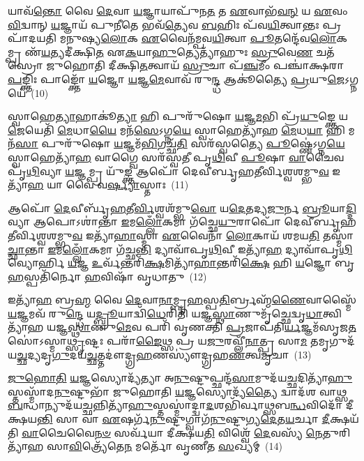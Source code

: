 𑌯𑌾𑌵᳴\-\ul{𑌨𑍍𑌤𑍋} 𑌵𑍈 \ul{𑌦𑍇}\-𑌵𑌾 \ul{𑌯}\-𑌜𑍍𑌞𑌾𑌯𑌾𑌪𑍁᳴𑌨\-\ul{𑌤} 𑌤 \ul{𑌏}\-𑌵𑌾𑌭᳴\-\ul{𑌵}\-\-\ul{𑌨𑍍} 𑌯 \ul{𑌏}\-𑌵𑌂 \ul{𑌵𑌿}\-𑌦𑍍𑌵𑌾𑌨𑍍 \ul{𑌯}\-𑌜𑍍𑌞𑌾𑌯᳴ 𑌪𑍁\-\ul{𑌨𑍀}\-𑌤𑍇 𑌭𑌵᳴\-\ul{𑌤𑍍𑌯𑍇}\-𑌵 \ul{𑌬}\-𑌹𑌿𑌃 𑌪᳴𑌵\-\ul{𑌯𑌿}\-𑌤𑍍𑌵𑌾𑌨𑍍𑌤𑌃 𑌪𑍍𑌰 𑌪𑌾᳴𑌦𑌯𑌤𑌿 𑌮𑌨𑍁𑌷𑍍𑌯\-\ul{𑌲𑍋}\-𑌕 \ul{𑌏}\-𑌵𑍈𑌨᳴𑌮𑍍𑌪𑌵\-\ul{𑌯𑌿}\-𑌤𑍍𑌵𑌾 \ul{𑌪𑍂}\-𑌤𑌨𑍍𑌦𑍇᳴𑌵\-\ul{𑌲𑍋}\-𑌕𑌮𑍍𑌪𑍍𑌰 𑌣᳴\-\ul{𑌯}\-𑌤𑍍𑌯𑌦𑍀॑𑌕𑍍𑌷𑌿\-\ul{𑌤} 𑌏\-\ul{𑌕}\-𑌯𑌾\-\ul{𑌹𑍁}\-𑌤𑍍𑌯𑍇𑌤𑍍𑌯𑌾᳴𑌹𑍁𑌃 \ul{𑌸𑍍𑌰𑍁}\-𑌵𑍇\-\ul{𑌣} 𑌚𑌤᳴𑌸𑍍𑌰𑍋 𑌜𑍁𑌹𑍋𑌤𑌿 𑌦𑍀𑌕𑍍𑌷𑌿\-\ul{𑌤}\-𑌤𑍍𑌵𑌾𑌯᳴ \ul{𑌸𑍍𑌰𑍁}\-𑌚𑌾 𑌪᳴\-\ul{𑌞𑍍𑌚}\-𑌮𑍀𑌂 𑌪𑌞𑍍𑌚𑌾॑𑌕𑍍𑌷𑌰𑌾 \ul{𑌪}\-𑌙𑍍𑌕𑍍𑌤𑌿𑌃 𑌪𑌾𑌙𑍍𑌕𑍍𑌤𑍋᳴ \ul{𑌯}\-𑌜𑍍𑌞𑍋 \ul{𑌯}\-𑌜𑍍𑌞\-\ul{𑌮𑍇}\-𑌵𑌾𑌵᳴ 𑌰𑍁\-\ul{𑌨𑍍𑌦𑍍𑌧} 𑌆𑌕𑍂॑𑌤𑍍𑌯𑍈 \ul{𑌪𑍍𑌰}\-𑌯𑍁\-\ul{𑌜𑍇}\-\-𑌽𑌗𑍍𑌨𑌯𑍇॑~(10)

𑌸𑍍𑌵𑌾𑌹𑍇\-\ul{𑌤𑍍𑌯𑌾}\-𑌹𑌾𑌕𑍂॑\-\ul{𑌤𑍍𑌯𑌾} 𑌹𑌿 𑌪𑍁𑌰𑍁᳴𑌷𑍋 \ul{𑌯}\-𑌜𑍍𑌞\-\ul{𑌮}\-𑌭𑌿 𑌪𑍍𑌰᳴\-\ul{𑌯𑍁}\-𑌙𑍍𑌕𑍍𑌤𑍇 𑌯\-\ul{𑌜𑍇}\-𑌯𑍇𑌤𑌿᳴ \ul{𑌮𑍇}\-𑌧𑌾\-\ul{𑌯𑍈} 𑌮𑌨᳴\-\ul{𑌸𑍇}\-\-𑌽𑌗𑍍𑌨\-\ul{𑌯𑍇} 𑌸𑍍𑌵𑌾𑌹𑍇𑌤𑍍𑌯𑌾᳴𑌹 \ul{𑌮𑍇}\-𑌧\-\ul{𑌯𑌾} 𑌹𑌿 𑌮𑌨᳴\-\ul{𑌸𑌾} 𑌪𑍁𑌰𑍁᳴𑌷𑍋 \ul{𑌯}\-𑌜𑍍𑌞𑌮᳴\-\ul{𑌭𑌿}\-𑌗𑌚𑍍𑌛᳴\-\ul{𑌤𑌿} 𑌸𑌰᳴𑌸𑍍𑌵𑌤𑍍𑌯𑍈 \ul{𑌪𑍂}\-𑌷𑍍𑌣𑍇॑\-𑌽𑌗𑍍𑌨\-\ul{𑌯𑍇} 𑌸𑍍𑌵𑌾𑌹𑍇𑌤𑍍𑌯𑌾᳴\-\ul{𑌹} 𑌵𑌾𑌗𑍍𑌵𑍈 𑌸𑌰᳴𑌸𑍍𑌵𑌤𑍀 𑌪𑍃\-\ul{𑌥𑌿}\-𑌵𑍀 \ul{𑌪𑍂}\-𑌷𑌾 \ul{𑌵𑌾}\-𑌚𑍈𑌵 𑌪𑍃᳴\-\ul{𑌥𑌿}\-𑌵𑍍𑌯𑌾 \ul{𑌯}\-𑌜𑍍𑌞𑌮𑍍𑌪𑍍𑌰 𑌯𑍁᳴\-\ul{𑌙𑍍𑌕𑍍𑌤} 𑌆𑌪𑍋᳴ 𑌦𑍇𑌵𑍀𑌰𑍍𑌬𑍃𑌹𑌤𑍀𑌰𑍍𑌵𑌿𑌶𑍍𑌵𑌶𑌮𑍍𑌭𑍁\-\ul{𑌵} 𑌇𑌤𑍍𑌯𑌾᳴\-\ul{𑌹} 𑌯𑌾 𑌵𑍈 𑌵\-\ul{𑌰𑍍𑌷𑍍𑌯𑌾}\-𑌸𑍍𑌤𑌾𑌃~(11)

𑌆𑌪𑍋᳴ \ul{𑌦𑍇}\-𑌵𑍀𑌰𑍍𑌬𑍃᳴\-\ul{𑌹}\-𑌤𑍀\-\ul{𑌰𑍍𑌵𑌿}\-𑌶𑍍𑌵𑌶᳴𑌮𑍍𑌭𑍁\-\ul{𑌵𑍋} 𑌯\-\ul{𑌦𑍇}\-𑌤𑌦𑍍𑌯\-\ul{𑌜𑍁}\-𑌰𑍍𑌨 \ul{𑌬𑍍𑌰𑍂}\-𑌯𑌾\-\ul{𑌦𑍍𑌦𑌿}\-𑌵𑍍𑌯𑌾 𑌆𑌪𑍋\-𑌽𑌶𑌾॑𑌨𑍍𑌤𑌾 \ul{𑌇}\-𑌮\-\ul{𑌲𑍍𑌲𑍋𑌁}\-𑌕𑌮𑌾 𑌗᳴𑌚𑍍𑌛𑍇\-\ul{𑌯𑍁}\-𑌰𑌾𑌪𑍋᳴ 𑌦𑍇𑌵𑍀𑌰𑍍𑌬𑍃𑌹𑌤𑍀𑌰𑍍𑌵𑌿𑌶𑍍𑌵𑌶𑌮𑍍𑌭𑍁\-\ul{𑌵} 𑌇𑌤𑍍𑌯𑌾᳴\-\ul{𑌹𑌾}\-𑌸𑍍𑌮𑌾 \ul{𑌏}\-𑌵𑍈𑌨𑌾᳴ \ul{𑌲𑍋}\-𑌕𑌾𑌯᳴ 𑌶𑌮𑌯\-\ul{𑌤𑌿} 𑌤𑌸𑍍𑌮𑌾॑\-\ul{𑌚𑍍𑌛𑌾}\-𑌨𑍍𑌤𑌾 \ul{𑌇}\-𑌮\-\ul{𑌲𑍍𑌲𑍋𑌁}\-𑌕𑌮𑌾 𑌗᳴𑌚𑍍𑌛\-\ul{𑌨𑍍𑌤𑌿} 𑌦𑍍𑌯𑌾𑌵𑌾᳴𑌪𑍃\-\ul{𑌥𑌿}\-𑌵𑍀 𑌇𑌤𑍍𑌯𑌾᳴\-\ul{𑌹} 𑌦𑍍𑌯𑌾𑌵𑌾᳴𑌪𑍃\-\ul{𑌥𑌿}\-𑌵𑍍𑌯𑍋𑌰𑍍\mbox{}𑌹𑌿 \ul{𑌯}\-𑌜𑍍𑌞 \ul{𑌉}\-𑌰𑍍𑌵᳴𑌨𑍍𑌤𑌰𑌿᳴\-\ul{𑌕𑍍𑌷}\-𑌮𑌿𑌤𑍍𑌯𑌾᳴\-\ul{𑌹𑌾}\-𑌨𑍍𑌤𑌰𑌿᳴\-\ul{𑌕𑍍𑌷𑍇} 𑌹𑌿 \ul{𑌯}\-𑌜𑍍𑌞𑍋 𑌬𑍃\-\ul{𑌹}\-𑌸𑍍𑌪𑌤𑌿᳴𑌰𑍍𑌨𑍋 \ul{𑌹}\-𑌵𑌿𑌷𑌾᳴ 𑌵𑍃𑌧𑌾𑌤𑍁~(12)

𑌇𑌤𑍍𑌯𑌾᳴\-\ul{𑌹} 𑌬𑍍𑌰\-\ul{𑌹𑍍𑌮} 𑌵𑍈 \ul{𑌦𑍇}\-𑌵𑌾\-\ul{𑌨𑌾}\-𑌮𑍍𑌬𑍃\-\ul{𑌹}\-𑌸𑍍𑌪\-\ul{𑌤𑌿}\-𑌰𑍍𑌬𑍍𑌰𑌹𑍍𑌮᳴\-\ul{𑌣𑍈}\-𑌵𑌾𑌸𑍍𑌮𑍈᳴ \ul{𑌯}\-𑌜𑍍𑌞𑌮𑌵᳴ 𑌰𑍁\-\ul{𑌨𑍍𑌦𑍍𑌧𑍇} 𑌯\-\ul{𑌦𑍍𑌬𑍍𑌰𑍂}\-𑌯𑌾𑌦𑍍𑌵𑌿᳴\-\ul{𑌧𑍇}\-𑌰𑌿𑌤𑌿᳴ 𑌯𑌜𑍍𑌞\-\ul{𑌸𑍍𑌥𑌾}\-𑌣𑍁𑌮𑍃᳴𑌚𑍍𑌛𑍇𑌦𑍍𑌵𑍃\-\ul{𑌧𑌾}\-𑌤𑍍𑌵𑌿𑌤𑍍𑌯𑌾᳴𑌹 𑌯𑌜𑍍𑌞\-\ul{𑌸𑍍𑌥𑌾}\-𑌣𑍁\-\ul{𑌮𑍇}\-𑌵 𑌪𑌰𑌿᳴ 𑌵𑍃𑌣𑌕𑍍𑌤𑌿 \ul{𑌪𑍍𑌰}\-𑌜𑌾𑌪᳴𑌤𑌿\-\ul{𑌰𑍍𑌯}\-𑌜𑍍𑌞𑌮᳴𑌸𑍃𑌜\-\ul{𑌤} 𑌸𑍋॑\-𑌽𑌸𑍍𑌮𑌾\-\ul{𑌥𑍍𑌸𑍃}\-𑌷𑍍𑌟𑌃 𑌪𑌰𑌾᳴\-\ul{𑌙𑍈}\-𑌥𑍍𑌸 𑌪𑍍𑌰 𑌯\-\ul{𑌜𑍁}\-𑌰𑌵𑍍𑌲𑍀᳴\-\ul{𑌨𑌾}\-𑌤𑍍𑌪𑍍𑌰 𑌸𑌾\-\ul{𑌮} 𑌤𑌮𑍃𑌗𑍁𑌦᳴𑌯\-\ul{𑌚𑍍𑌛}\-𑌦𑍍𑌯𑌦𑍃\-\ul{𑌗𑍁}\-𑌦𑌯᳴\-\ul{𑌚𑍍𑌛}\-𑌤𑍍𑌤𑌦𑍗॑𑌦𑍍𑌗𑍍𑌰\-\ul{𑌹}\-𑌣𑌸𑍍𑌯𑍗॑𑌦𑍍𑌗𑍍𑌰𑌹\-\ul{𑌣}\-𑌤𑍍𑌵\-\ul{𑌮𑍃}\-𑌚𑌾~(13)

\-\ul{𑌜𑍁}\-\-\ul{𑌹𑍋}\-\-\ul{𑌤𑌿} \ul{𑌯}\-𑌜𑍍𑌞𑌸𑍍𑌯𑍋𑌦𑍍𑌯᳴𑌤𑍍𑌯𑌾 𑌅\-\ul{𑌨𑍁}\-𑌷𑍍𑌟𑍁𑌪𑍍𑌛𑌨𑍍𑌦᳴\-\ul{𑌸𑌾}\-𑌮𑍁𑌦᳴𑌯\-\ul{𑌚𑍍𑌛}\-𑌦𑌿𑌤𑍍𑌯𑌾᳴\-\ul{𑌹𑍁}\-𑌸𑍍𑌤𑌸𑍍𑌮𑌾᳴𑌦\-\ul{𑌨𑍁}\-𑌷𑍍𑌟𑍁𑌭𑌾᳴ 𑌜𑍁𑌹𑍋𑌤𑌿 \ul{𑌯}\-𑌜𑍍𑌞𑌸𑍍𑌯𑍋𑌦𑍍𑌯᳴\-\ul{𑌤𑍍𑌯𑍈} 𑌦𑍍𑌵𑌾𑌦᳴𑌶 𑌵𑌾𑌥𑍍𑌸\-\ul{𑌬}\-𑌨𑍍𑌧𑌾𑌨𑍍𑌯𑍁𑌦᳴𑌯\-\ul{𑌚𑍍𑌛}\-𑌨𑍍𑌨𑌿𑌤𑍍𑌯𑌾᳴\-\ul{𑌹𑍁}\-𑌸𑍍𑌤𑌸𑍍𑌮𑌾॑𑌦𑍍𑌦𑍍𑌵𑌾\-\ul{𑌦}\-𑌶𑌭𑌿᳴𑌰𑍍𑌵𑌾𑌥𑍍𑌸𑌬\-\ul{𑌨𑍍𑌧}\-𑌵𑌿𑌦𑍋᳴ 𑌦𑍀𑌕𑍍𑌷𑌯\-\ul{𑌨𑍍𑌤𑌿} 𑌸𑌾 𑌵𑌾 \ul{𑌏}\-𑌷𑌰𑍍𑌗᳴\-\ul{𑌨𑍁}\-𑌷𑍍𑌟𑍁𑌗𑍍𑌵𑌾𑌗᳴\-\ul{𑌨𑍁}\-𑌷𑍍𑌟𑍁𑌗𑍍𑌯\-\ul{𑌦𑍇}\-𑌤\-\ul{𑌯}\-𑌰𑍍𑌚𑌾 \ul{𑌦𑍀}\-𑌕𑍍𑌷𑌯᳴𑌤𑌿 \ul{𑌵𑌾}\-𑌚𑍈𑌵𑍈\-\ul{𑌨}\-\-\ul{𑍞} 𑌸𑌰𑍍𑌵᳴𑌯𑌾 𑌦𑍀𑌕𑍍𑌷𑌯\-\ul{𑌤𑌿} 𑌵𑌿𑌶𑍍𑌵𑍇᳴ \ul{𑌦𑍇}\-𑌵𑌸𑍍𑌯᳴ \ul{𑌨𑍇}\-𑌤𑍁𑌰𑌿𑌤𑍍𑌯𑌾᳴𑌹 𑌸𑌾\-\ul{𑌵𑌿}\-𑌤𑍍𑌰𑍍𑌯𑍇᳴𑌤𑍇\-\ul{𑌨} 𑌮𑌰𑍍𑌤𑍋᳴ 𑌵𑍃𑌣𑍀𑌤 \ul{𑌸}\-𑌖𑍍𑌯𑌮𑍍~(14)

